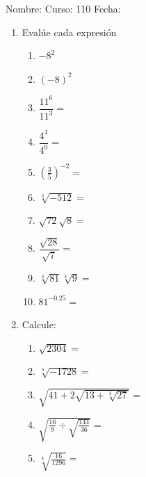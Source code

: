 \documentclass[fleqn]{article}
\newcommand{\LineaNombre}{%
\par
\vspace{\baselineskip}
Nombre:\hrulefill \; Curso: 110\underline{\hspace*{12pt}} \; Fecha: \underline{\hspace*{2.5cm}} \relax
\par}
\begin{document}
\LineaNombre
\begin{enumerate}
   \item Evalúe cada expresión
   \begin{enumerate}
   \item $-8^{2}$\noanswer
   \item $(-8)^{2}$\noanswer
   \item $\dfrac{11^{6}}{11^{3}}=$ \noanswer
   \item $\dfrac{4^{4}}{4^{0}}=$ \noanswer
   \item $(\frac{3}{5})^{-2}=$ \noanswer
   \item $\sqrt[3]{-512}=$\noanswer
   \item $\sqrt{72}\sqrt{8}=$\noanswer
   \item $\dfrac{\sqrt{28}}{\sqrt{7}}=$\noanswer
   \item $\sqrt[3]{81}\sqrt[3]{9}=$\noanswer
   \item $81^{-0.25}=$\noanswer
   \end{enumerate}
   \newpage
   \item Calcule:
   \begin{enumerate}
   \item $\sqrt{2304}=$\noanswer
   \item $\sqrt[3]{-1728}=$\noanswer
   \item $\sqrt{41+2\sqrt{13+\sqrt[3]{27}}}=$\noanswer
   \item $\sqrt{\frac{16}{9}\div\sqrt{\frac{144}{36}}}=$\noanswer
   \item $\sqrt[4]{\frac{16}{1296}}=$\noanswer
   \end{enumerate}
   \end{enumerate}
\end{document}
